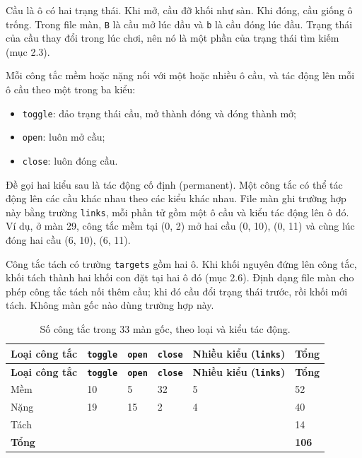 Cầu là ô có hai trạng thái. Khi mở, cầu đỡ khối như sàn. Khi đóng, cầu giống ô trống. Trong file màn, \texttt{B} là cầu mở lúc đầu và \texttt{b} là cầu đóng lúc đầu. Trạng thái của cầu thay đổi trong lúc chơi, nên nó là một phần của trạng thái tìm kiếm (mục 2.3).

Mỗi công tắc mềm hoặc nặng nối với một hoặc nhiều ô cầu, và tác động lên mỗi ô cầu theo một trong ba kiểu:

\begin{itemize}
\tightlist
\item
  \texttt{toggle}: đảo trạng thái cầu, mở thành đóng và đóng thành mở;
\item
  \texttt{open}: luôn mở cầu;
\item
  \texttt{close}: luôn đóng cầu.
\end{itemize}

Đề gọi hai kiểu sau là tác động cố định (permanent). Một công tắc có thể tác động lên các cầu khác nhau theo các kiểu khác nhau. File màn ghi trường hợp này bằng trường \texttt{links}, mỗi phần tử gồm một ô cầu và kiểu tác động lên ô đó. Ví dụ, ở màn 29, công tắc mềm tại (0, 2) mở hai cầu (0, 10), (0, 11) và cùng lúc đóng hai cầu (6, 10), (6, 11).

Công tắc tách có trường \texttt{targets} gồm hai ô. Khi khối nguyên đứng lên công tắc, khối tách thành hai khối con đặt tại hai ô đó (mục 2.6). Định dạng file màn cho phép công tắc tách nối thêm cầu; khi đó cầu đổi trạng thái trước, rồi khối mới tách. Không màn gốc nào dùng trường hợp này.

\begin{longtable}[]{@{}llllll@{}}
\caption{ Số công tắc trong 33 màn gốc, theo loại và kiểu tác động.}\tabularnewline
\toprule\noalign{}
\rowcolor{tablehead}\textbf{Loại công tắc} & \textbf{\texttt{toggle}} & \textbf{\texttt{open}} & \textbf{\texttt{close}} & \textbf{Nhiều kiểu (\texttt{links})} & \textbf{Tổng} \\
\midrule\noalign{}
\endfirsthead
\toprule\noalign{}
\rowcolor{tablehead}\textbf{Loại công tắc} & \textbf{\texttt{toggle}} & \textbf{\texttt{open}} & \textbf{\texttt{close}} & \textbf{Nhiều kiểu (\texttt{links})} & \textbf{Tổng} \\
\midrule\noalign{}
\endhead
\bottomrule\noalign{}
\endlastfoot
Mềm & 10 & 5 & 32 & 5 & 52 \\
Nặng & 19 & 15 & 2 & 4 & 40 \\
Tách & & & & & 14 \\
\textbf{Tổng} & & & & & \textbf{106} \\
\end{longtable}

